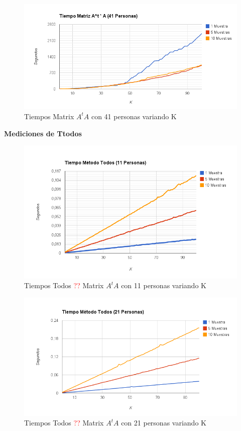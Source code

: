 \begin{figure}[H]
\includegraphics[width=1\textwidth]{img/image3.png}
     \caption{Tiempos Matrix $A^tA$ con 41 personas variando K}
     \label{fig:figura1}
\end{figure}


\textbf{Mediciones de Ttodos }

\begin{figure}[H]
\includegraphics[width=1\textwidth]{img/image4.png}
     \caption{Tiempos Todos \textcolor{red}{??} Matrix $A^tA$ con 11 personas variando K}
     \label{fig:figura1}
\end{figure}

\begin{figure}[H]
\includegraphics[width=1\textwidth]{img/image5.png}
     \caption{Tiempos Todos \textcolor{red}{??} Matrix $A^tA$ con 21 personas variando K}
     \label{fig:figura1}
\end{figure}

